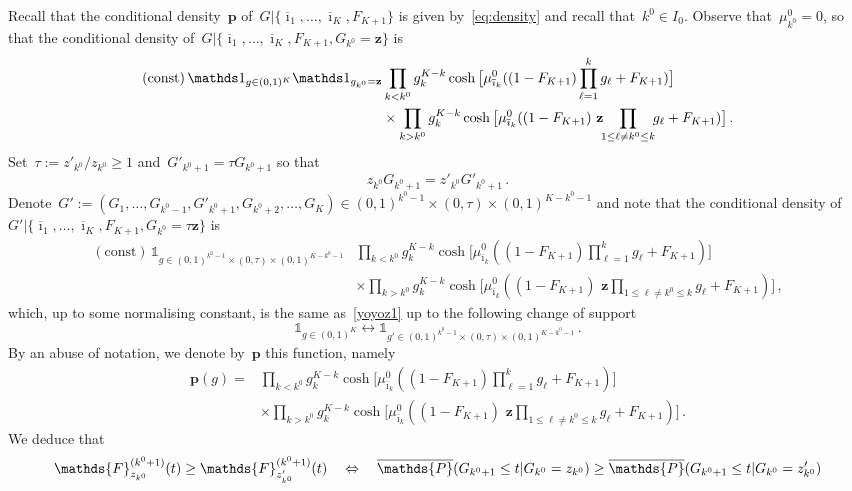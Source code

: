 \documentclass[final,numbib]{imaiai}%
\numberwithin{equation}{section}
\def\bp{\mathbf{p}}
\def\bz{\mathbf{z}}
\def\bbF{\mathds{F}}
\def\bbP{\mathds{P}}
\renewcommand{\bar}{\overline}
\def\\bUnif{\text{\bUnif}}
\newcommand{\<}{\langle}
\renewcommand{\>}{\rangle}
\newcommand{\1}{\mathds{1}}
\begin{document}
{ Recall that the conditional density~$\bp$ of~$G|\{\bar \imath_1,\ldots,\bar \imath_K,F_{K+1}\}$ is given by~\eqref{eq:density} and recall that~$k^0\in I_0$. Observe that~$\mu^0_{k^0}=0$, so that the conditional density of~$G|\{\bar \imath_1,\ldots,\bar \imath_K,F_{K+1}, G_{k^0}=\bz\}$ is
 \begin{align}
 \mathrm{(const)}\,\mathds 1_{g\in(0,1)^K}\mathds 1_{g_{k^0}=\bz}&\prod_{k< k^0}g_k^{K-k}\cosh\big[{\mu^0_{\bar\imath_k}}((1-F_{K+1})\prod_{\ell=1}^kg_\ell+F_{K+1})\big]\label{yoyoz1}
 \\&\times \prod_{k> k^0}g_k^{K-k}\cosh\big[{\mu^0_{\bar\imath_k}}((1-F_{K+1})\,\,\bz\!\!\prod_{1\leq \ell\neq k^0\leq k}\!\!g_\ell+F_{K+1})\big]\,.\notag
 \end{align}
 Set~$\tau:=z'_{k^0}/z_{k^0}\geq 1$ and~$G'_{k^0+1}=\tau G_{k^0+1}$ so that 
 \[
 z_{k^0} G_{k^0+1}=z'_{k^0}G'_{k^0+1}\,.
 \]
 Denote~$G':=(G_1,\ldots,G_{k^0-1},G'_{k^0+1},G_{k^0+2},\ldots,G_K)\in(0,1)^{k^0-1}\times(0,\tau)\times(0,1)^{K-k^0-1}$ and note that the conditional density of~$G'|\{\bar \imath_1,\ldots,\bar \imath_K,F_{K+1}, G_{k^0}=\tau \bz\}$ is
 \begin{align*}
 \mathrm{(const)}\,\mathds 1_{g\in(0,1)^{k^0-1}\times(0,\tau)\times(0,1)^{K-k^0-1}}
 &\prod_{k< k^0}g_k^{K-k}\cosh\big[{\mu^0_{\bar\imath_k}}((1-F_{K+1})\prod_{\ell=1}^kg_\ell+F_{K+1})\big]
 \\&\times \prod_{k> k^0}g_k^{K-k}\cosh\big[{\mu^0_{\bar\imath_k}}((1-F_{K+1})\,\,\bz\!\!\prod_{1\leq \ell\neq k^0\leq k}\!\!g_\ell+F_{K+1})\big]\,,
 \end{align*}
 which, up to some normalising constant, is the same as~\eqref{yoyoz1} up to the following change of support
 \[
 \mathds 1_{g\in(0,1)^K}\leftrightarrow \mathds 1_{g'\in(0,1)^{k^0-1}\times(0,\tau)\times(0,1)^{K-k^0-1}}\,.
 \]
 By an abuse of notation, we denote by~$\bp$ this function, namely
 \begin{align*}
\bp(g)=
 &\prod_{k< k^0}g_k^{K-k}\cosh\big[{\mu^0_{\bar\imath_k}}((1-F_{K+1})\prod_{\ell=1}^kg_\ell+F_{K+1})\big]
 \\&\times \prod_{k> k^0}g_k^{K-k}\cosh\big[{\mu^0_{\bar\imath_k}}((1-F_{K+1})\,\,\bz\!\!\prod_{1\leq \ell\neq k^0\leq k}\!\!g_\ell+F_{K+1})\big]\,.
 \end{align*}
We deduce that
\begin{align}
 \bbF_{z_{k^0}}^{(k^0+1)}(t)\geq \bbF_{z'_{k^0}}^{(k^0+1)}(t)\quad
 &\Leftrightarrow\quad \bar\bbP(G_{k^0+1}\leq t|G_{k^0}=z_{k^0})\geq
 \bar\bbP(G_{k^0+1}\leq t|G_{k^0}=z'_{k^0})\notag\\

\end{align}}
\end{document}
